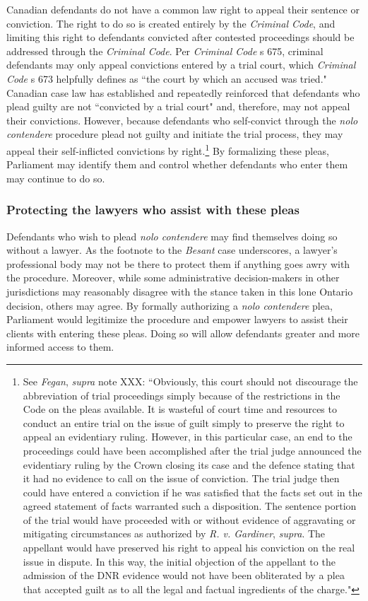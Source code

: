 Canadian defendants do not have a common law right to appeal their sentence or conviction. The right to do so is created entirely by the \textit{Criminal Code}, and limiting this right to defendants convicted after contested proceedings should be addressed through the \textit{Criminal Code}. Per \textit{Criminal Code} s 675, criminal defendants may only appeal convictions entered by a trial court, which \textit{Criminal Code} s 673 helpfully defines as ``the court by which an accused was tried." Canadian case law has established and repeatedly reinforced that defendants who plead guilty are not ``convicted by a trial court" and, therefore, may not appeal their convictions. However, because defendants who self-convict through the \textit{nolo contendere} procedure plead not guilty and initiate the trial process, they may appeal their self-inflicted convictions by right.\footnote{See \textit{Fegan}, \textit{supra} note XXX: ``Obviously, this court should not discourage the abbreviation of trial proceedings simply because of the restrictions in the Code on the pleas available. It is wasteful of court time and resources to conduct an entire trial on the issue of guilt simply to preserve the right to appeal an evidentiary ruling. However, in this particular case, an end to the proceedings could have been accomplished after the trial judge announced the evidentiary ruling by the Crown closing its case and the defence stating that it had no evidence to call on the issue of conviction. The trial judge then could have entered a conviction if he was satisfied that the facts set out in the agreed statement of facts warranted such a disposition. The sentence portion of the trial would have proceeded with or without evidence of aggravating or mitigating circumstances as authorized by \textit{R. v. Gardiner}, \textit{supra}. The appellant would have preserved his right to appeal his conviction on the real issue in dispute. In this way, the initial objection of the appellant to the admission of the DNR evidence would not have been obliterated by a plea that accepted guilt as to all the legal and factual ingredients of the charge."}  By formalizing these pleas, Parliament may identify them and control whether defendants who enter them may continue to do so.

\subsubsection{Protecting the lawyers who assist with these pleas}

Defendants who wish to plead \textit{nolo contendere} may find themselves doing so without a lawyer. As the footnote to the \textit{Besant} case underscores, a lawyer's professional body may not be there to protect them if anything goes awry with the procedure. Moreover, while some administrative decision-makers in other jurisdictions may reasonably disagree with the stance taken in this lone Ontario decision, others may agree. By formally authorizing a \textit{nolo contendere} plea, Parliament would legitimize the procedure and empower lawyers to assist their clients with entering these pleas. Doing so will allow defendants greater and more informed access to them.